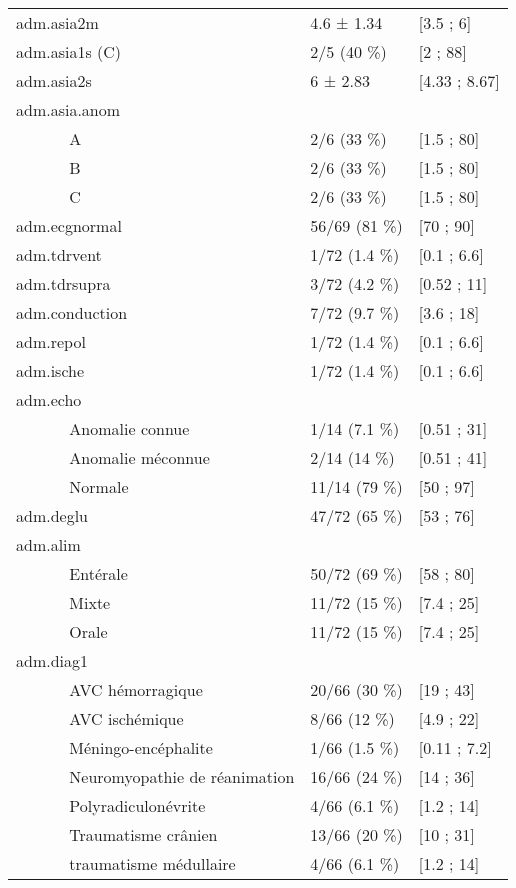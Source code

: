 \documentclass[]{article}
\begin{document}
\begin{longtable}{lll}
  adm.asia2m & 4.6 ± 1.34 & [3.5 ; 6] \\ 
  adm.asia1s (C) & 2/5 (40 \%) &  [2 ; 88] \\ 
  adm.asia2s & 6 ± 2.83 & [4.33 ; 8.67] \\ 
  adm.asia.anom &   &   \\ 
  ~~~~~~ A & 2/6 (33 \%) &  [1.5 ; 80] \\ 
  ~~~~~~ B & 2/6 (33 \%) &  [1.5 ; 80] \\ 
  ~~~~~~ C & 2/6 (33 \%) &  [1.5 ; 80] \\ 
  adm.ecgnormal & 56/69 (81 \%) &  [70 ; 90] \\ 
  adm.tdrvent & 1/72 (1.4 \%) &  [0.1 ; 6.6] \\ 
  adm.tdrsupra & 3/72 (4.2 \%) &  [0.52 ; 11] \\ 
  adm.conduction & 7/72 (9.7 \%) &  [3.6 ; 18] \\ 
  adm.repol & 1/72 (1.4 \%) &  [0.1 ; 6.6] \\ 
  adm.ische & 1/72 (1.4 \%) &  [0.1 ; 6.6] \\ 
  adm.echo &   &   \\ 
  ~~~~~~ Anomalie connue & 1/14 (7.1 \%) &  [0.51 ; 31] \\ 
  ~~~~~~ Anomalie méconnue & 2/14 (14 \%) &  [0.51 ; 41] \\ 
  ~~~~~~ Normale & 11/14 (79 \%) &  [50 ; 97] \\ 
  adm.deglu & 47/72 (65 \%) &  [53 ; 76] \\ 
  adm.alim &   &   \\ 
  ~~~~~~ Entérale & 50/72 (69 \%) &  [58 ; 80] \\ 
  ~~~~~~ Mixte & 11/72 (15 \%) &  [7.4 ; 25] \\ 
  ~~~~~~ Orale & 11/72 (15 \%) &  [7.4 ; 25] \\ 
  adm.diag1 &   &   \\ 
  ~~~~~~ AVC hémorragique & 20/66 (30 \%) &  [19 ; 43] \\ 
  ~~~~~~ AVC ischémique & 8/66 (12 \%) &  [4.9 ; 22] \\ 
  ~~~~~~ Méningo-encéphalite & 1/66 (1.5 \%) &  [0.11 ; 7.2] \\ 
  ~~~~~~ Neuromyopathie de réanimation & 16/66 (24 \%) &  [14 ; 36] \\ 
  ~~~~~~ Polyradiculonévrite & 4/66 (6.1 \%) &  [1.2 ; 14] \\ 
  ~~~~~~ Traumatisme crânien & 13/66 (20 \%) &  [10 ; 31] \\ 
  ~~~~~~ traumatisme médullaire & 4/66 (6.1 \%) &  [1.2 ; 14] \\ 

\end{longtable}
\end{document}
